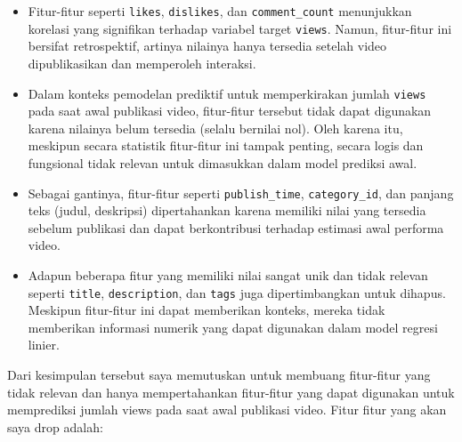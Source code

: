 \begin{itemize}
    \item Fitur-fitur seperti \texttt{likes}, \texttt{dislikes}, dan \texttt{comment\_count} menunjukkan korelasi yang signifikan terhadap variabel target \texttt{views}. Namun, fitur-fitur ini bersifat retrospektif, artinya nilainya hanya tersedia setelah video dipublikasikan dan memperoleh interaksi.
    
    \item Dalam konteks pemodelan prediktif untuk memperkirakan jumlah \texttt{views} pada saat awal publikasi video, fitur-fitur tersebut tidak dapat digunakan karena nilainya belum tersedia (selalu bernilai nol). Oleh karena itu, meskipun secara statistik fitur-fitur ini tampak penting, secara logis dan fungsional tidak relevan untuk dimasukkan dalam model prediksi awal.
    
    \item Sebagai gantinya, fitur-fitur seperti \texttt{publish\_time}, \texttt{category\_id}, dan panjang teks (judul, deskripsi) dipertahankan karena memiliki nilai yang tersedia sebelum publikasi dan dapat berkontribusi terhadap estimasi awal performa video.
    \item Adapun beberapa fitur yang memiliki nilai sangat unik dan tidak relevan seperti \texttt{title}, \texttt{description}, dan \texttt{tags} juga dipertimbangkan untuk dihapus. Meskipun fitur-fitur ini dapat memberikan konteks, mereka tidak memberikan informasi numerik yang dapat digunakan dalam model regresi linier.
\end{itemize}




Dari kesimpulan tersebut saya memutuskan untuk membuang fitur-fitur yang tidak relevan dan hanya mempertahankan fitur-fitur yang dapat digunakan untuk memprediksi jumlah views pada saat awal publikasi video. Fitur fitur yang akan saya drop adalah:

